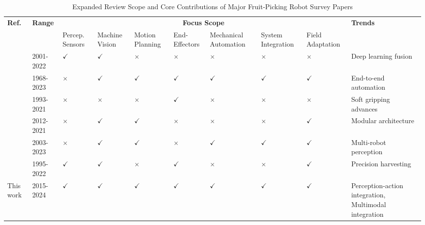 \documentclass[pdflatex,sn-mathphys-num]{sn-jnl}
\begin{document}
\begin{table}[htbp]
\centering
\small
\caption{Expanded Review Scope and Core Contributions of Major Fruit-Picking Robot Survey Papers}
\renewcommand{\arraystretch}{1.3}
\begin{tabular}{
    p{1.5cm}  %
    p{1.5cm}    %
    p{0.8cm}p{0.8cm}p{0.8cm}p{0.8cm}p{0.8cm}p{0.8cm}p{0.8cm} %
    p{2.5cm}  %
}
\hline
\multirow{2}{*}{\textbf{Ref.}}
& \multirow{2}{*}{\textbf{Range}}
& \multicolumn{7}{c}{\textbf{Focus Scope}}
& \multirow{2}{*}{\textbf{Trends}} \\
&& \small Percep. Sensors
& \small Machine Vision
& \small Motion Planning
& \small End-Effectors
& \small Mechanical Automation
& \small System Integration
& \small Field Adaptation
& \\
\hline
\cite{hou2023overview}      & 2001-2022
& \ensuremath{\checkmark} & \ensuremath{\checkmark} & \ensuremath{\times} & \ensuremath{\times} & \ensuremath{\times} & \ensuremath{\times} & \ensuremath{\times}
& Deep learning fusion \\

\cite{zhang2024automatic}   & 1968-2023
& \ensuremath{\times} & \ensuremath{\checkmark} & \ensuremath{\checkmark} & \ensuremath{\checkmark} & \ensuremath{\checkmark} & \ensuremath{\checkmark} & \ensuremath{\checkmark}
& End-to-end automation \\

\cite{navas2021soft}        & 1993-2021
& \ensuremath{\times} & \ensuremath{\times} & \ensuremath{\times} & \ensuremath{\checkmark} & \ensuremath{\times} & \ensuremath{\times} & \ensuremath{\times}
& Soft gripping advances \\

\cite{zhou2022intelligent}  & 2012-2021
& \ensuremath{\times} & \ensuremath{\checkmark} & \ensuremath{\checkmark} & \ensuremath{\times} & \ensuremath{\times} & \ensuremath{\times} & \ensuremath{\checkmark}
& Modular architecture \\

\cite{mingyou2024orchard}   & 2003-2023
& \ensuremath{\times} & \ensuremath{\checkmark} & \ensuremath{\checkmark} & \ensuremath{\times} & \ensuremath{\checkmark} & \ensuremath{\checkmark} & \ensuremath{\checkmark}
& Multi-robot perception \\

\cite{rajendran2024towards} & 1995-2022
& \ensuremath{\checkmark} & \ensuremath{\checkmark} & \ensuremath{\times} & \ensuremath{\checkmark} & \ensuremath{\times} & \ensuremath{\times} & \ensuremath{\checkmark}
& Precision harvesting \\
This work & 2015-2024
& \ensuremath{\checkmark} & \ensuremath{\checkmark} & \ensuremath{\checkmark} & \ensuremath{\checkmark} & \ensuremath{\checkmark} & \ensuremath{\checkmark} & \ensuremath{\checkmark}
& Perception-action integration, \newline Multimodal integration \\
\hline
\end{tabular}
\label{tab:survey_summary}
\end{table}
\end{document}

